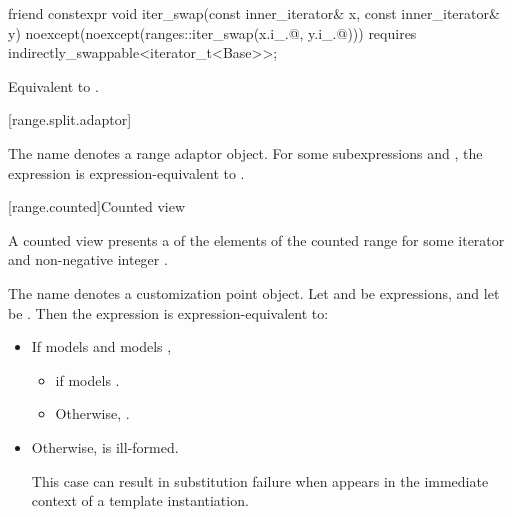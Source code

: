 %
\begin{itemdecl}
friend constexpr void iter_swap(const inner_iterator& x, const inner_iterator& y)
  noexcept(noexcept(ranges::iter_swap(x.i_.@, y.i_.@)))
  requires indirectly_swappable<iterator_t<Base>>;
\end{itemdecl}

\begin{itemdescr}
\pnum
\effects
Equivalent to
.
\end{itemdescr}

[range.split.adaptor]{}

\pnum
The name  denotes a
range adaptor object.
For some subexpressions  and ,
the expression  is expression-equivalent to
.


[range.counted]{Counted view}

\pnum
A counted view presents a  of the elements
of the counted range 
for some iterator  and non-negative integer .

\pnum
The name  denotes a
customization point object.
Let  and  be expressions,
and let  be .
Then the expression  is expression-equivalent to:
\begin{itemize}
\item If  models  and
   models ,
  \begin{itemize}
  \item {}
    if  models .
  \item Otherwise,
    .
\end{itemize}

\item Otherwise,  is ill-formed.
  \begin{note}
  This case can result in substitution failure when 
  appears in the immediate context of a template instantiation.
  \end{note}
\end{itemize}

